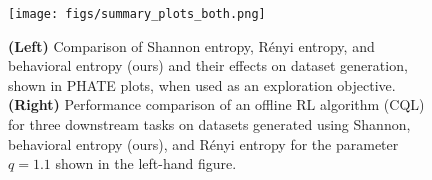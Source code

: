 %
%
%
%
\begin{figure}[tp]
    \texttt{[image: figs/summary\_plots\_both.png]}
    \caption{\small \textbf{(Left)} Comparison of Shannon entropy, R\'{e}nyi entropy, and behavioral entropy (ours) and their effects on dataset generation, shown in PHATE plots, when used as an exploration objective. \textbf{(Right)} Performance comparison of an offline RL algorithm (CQL) for three downstream tasks on datasets generated using Shannon, behavioral entropy (ours), and R\'{e}nyi entropy for the parameter $q = 1.1$ shown in the left-hand figure.}
    \label{fig:intro}
\end{figure}
%
%
%

